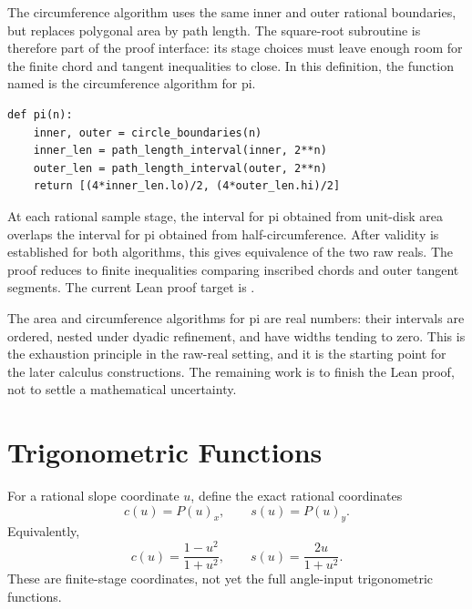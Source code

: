 \begin{definition}\label{def:circle-circumference-stage-algorithm}
The circumference algorithm uses the same inner and outer rational boundaries,
but replaces polygonal area by path length.  The square-root subroutine is
therefore part of the proof interface: its stage choices must leave enough
room for the finite chord and tangent inequalities to close.  In this
definition, the function named  is the circumference algorithm for
pi.
\begin{verbatim}
def pi(n):
    inner, outer = circle_boundaries(n)
    inner_len = path_length_interval(inner, 2**n)
    outer_len = path_length_interval(outer, 2**n)
    return [(4*inner_len.lo)/2, (4*outer_len.hi)/2]
\end{verbatim}
\end{definition}

\begin{theorem}\label{thm:finite-archimedes}
At each rational sample stage, the interval for pi obtained from unit-disk
area overlaps the interval for pi obtained from half-circumference.  After
validity is established for both algorithms, this gives equivalence of the
two raw reals.
The proof reduces to finite inequalities comparing inscribed chords and
outer tangent segments.  The current Lean proof target is
.
\end{theorem}

\begin{theorem}\label{thm:geometric-pi-validity}
The area and circumference algorithms for pi are real numbers: their intervals
are ordered, nested under dyadic refinement, and have widths tending to zero.
This is the exhaustion principle in the raw-real setting, and it is the
starting point for the later calculus constructions.  The remaining work is
to finish the Lean proof, not to settle a mathematical uncertainty.
\end{theorem}

\section{Trigonometric Functions}

\begin{definition}
\label{def:rational-circle-sin-cos}
For a rational slope coordinate \(u\), define the exact rational coordinates
\[
  c(u)=P(u)_x,\qquad s(u)=P(u)_y.
\]
Equivalently,
\[
  c(u)=\frac{1-u^2}{1+u^2},
  \qquad
  s(u)=\frac{2u}{1+u^2}.
\]
These are finite-stage coordinates, not yet the full angle-input
trigonometric functions.
\end{definition}

